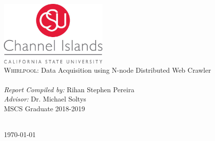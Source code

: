 \begin{titlepage}
\begin{center}
\includegraphics[width=0.40\textwidth]{../media/correctlogo.jpg}~\\[1cm]


{\large {\textsc{Whirlpool:} Data Acquisition using N-node Distributed Web Crawler}}\\[0.5cm]

\HRule \\[0.4cm]
{\textit{Report Compiled by:} {Rihan Stephen Pereira}}\\[0.1cm]
{\textit{Advisor:} {Dr. Michael Soltys}}\\[0.1cm]
{\small {MSCS Graduate 2018-2019}}\\[0.1cm]
\HRule \\[1.5cm]


\vfill

{\large \today}
\end{center}
\end{titlepage}

